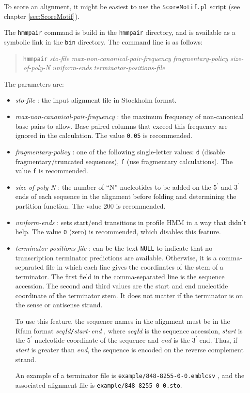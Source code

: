 \documentclass[letterpaper,12pt]{report}
\newcommand{\example}[1]{
\begin{quote}
{\raggedright
#1
}
\end{quote}
}
\begin{document}
To score an alignment, it might be easiest to use the {\tt ScoreMotif.pl} script (see chapter \ref{sec:ScoreMotif}).

The {\tt hmmpair} command is build in the {\tt hmmpair} directory, and is available as a symbolic link in the {\tt bin} directory.  The command line is as follows:
\example{
{\tt hmmpair} {\it sto-file} {\it max-non-canonical-pair-frequency} {\it fragmentary-policy} {\it size-of-poly-N} {\it uniform-ends} {\it terminator-positions-file}
}
The parameters are:
\begin{itemize}
\item {\it sto-file} : the input alignment file in Stockholm format.
\item {\it max-non-canonical-pair-frequency} : the maximum frequency of non-canonical base pairs to allow.  Base paired columns that exceed this frequency are ignored in the calculation.  The value {\tt 0.05} is recommended.
\item {\it fragmentary-policy} : one of the following single-letter values: {\tt d} (disable fragmentary/truncated sequences), {\tt f} (use fragmentary calculations).  The value {\tt f} is recommended.
\item {\it size-of-poly-N} : the number of ``N'' nucleotides to be added on the $5^\prime$ and $3^\prime$ ends of each sequence in the alignment before folding and determining the partition function.  The value 200 is recommended.
\item {\it uniform-ends} : sets start/end transitions in profile HMM in a way that didn't help.  The value {\tt 0} (zero) is recommended, which disables this feature.
\item {\it terminator-positions-file} : can be the text {\tt NULL} to indicate that no transcription terminator predictions are available.  Otherwise, it is a comma-separated file in which each line gives the coordinates of the stem of a terminator.  The first field in the comma-separated line is the sequence accession.  The second and third values are the start and end nucleotide coordinate of the terminator stem.  It does not matter if the terminator is on the sense or antisense strand.

To use this feature, the sequence names in the alignment must be in the Rfam format {\it seqId}{\tt /}{\it start}{\tt -}{\it end} , where {\it seqId} is the sequence accession, {\it start} is the $5^\prime$ nucleotide coordinate of the sequence and {\it end} is the $3^\prime$ end.  Thus, if {\it start} is greater than {\it end}, the sequence is encoded on the reverse complement strand.

An example of a terminator file is {\tt example/848-8255-0-0.emblcsv} , and the associated alignment file is {\tt example/848-8255-0-0.sto}.
\end{itemize}
\end{document}
